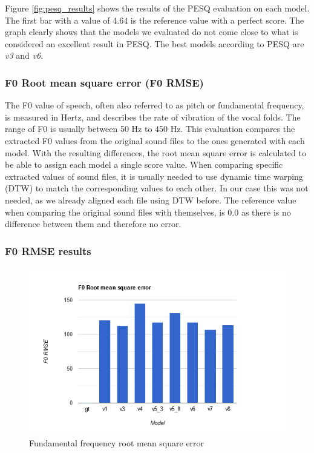\documentclass[a4paper]{article}
\begin{document}
Figure \ref{fig:pesq_results} shows the results of the PESQ evaluation on each
model. The first bar with a value of 4.64 is the reference value with a perfect
score. The graph clearly shows that the models we evaluated do not come close to
what is considered an excellent result in PESQ. The best models according to
PESQ are \emph{v3} and \emph{v6}.

\subsubsection*{F0 Root mean square error (F0 RMSE)}
The F0 value of speech, often also referred to as pitch or fundamental
frequency, is measured in Hertz, and describes the rate of vibration of the
vocal folds. The range of F0 is usually between 50 Hz to 450 Hz. This evaluation
compares the extracted F0 values from the original sound files to the ones
generated with each model. With the resulting differences, the root mean square
error is calculated to be able to assign each model a single score value. When
comparing specific extracted values of sound files, it is usually needed to use
dynamic time warping (DTW) to match the corresponding values to each other. In
our case this was not needed, as we already aligned each file using DTW before.
The reference value when comparing the original sound files with themselves, is
0.0 as there is no difference between them and therefore no error.

\subsubsection*{F0 RMSE results}
\begin{figure}[hbtp]
    \includegraphics[width=\textwidth]{evaluation/graphs/F0RMSE.png}
    \caption{Fundamental frequency root mean square error}
    \label{fig:f0rmse_results}
\end{figure}
\end{document}
